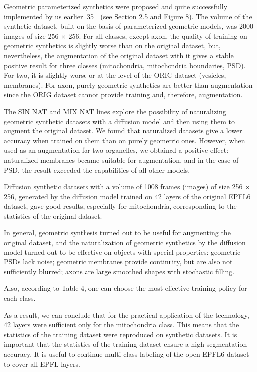 \documentclass[journal,article,submit,pdftex,moreauthors]{Definitions/mdpi}
\begin{document}
Geometric parameterized synthetics were proposed and quite successfully implemented by us earlier [35 ] (see Section 2.5 and Figure 8). The volume of the synthetic dataset, built on the basis of parameterized geometric models, was 2000 images of size 256 × 256. For all classes, except axon, the quality of training on geometric synthetics is slightly worse than on the original dataset, but, nevertheless, the augmentation of the original dataset with it gives a stable positive result for three classes (mitochondria, mitochondria boundaries, PSD). For two, it is slightly worse or at the level of the ORIG dataset (vesicles, membranes). For axon, purely geometric synthetics are better than augmentation since the ORIG dataset cannot provide training and, therefore, augmentation.

The SIN NAT and MIX NAT lines explore the possibility of naturalizing geometric synthetic datasets with a diffusion model and then using them to augment the original dataset. We found that naturalized datasets give a lower accuracy when trained on them than on purely geometric ones. However, when used as an augmentation for two organelles, we obtained a positive effect: naturalized membranes became suitable for augmentation, and in the case of PSD, the result exceeded the capabilities of all other models.

Diffusion synthetic datasets with a volume of 1008 frames (images) of size 256 × 256, generated by the diffusion model trained on 42 layers of the original EPFL6 dataset, gave good results, especially for mitochondria, corresponding to the statistics of the original dataset.

In general, geometric synthesis turned out to be useful for augmenting the original dataset, and the naturalization of geometric synthetics by the diffusion model turned out to be effective on objects with special properties: geometric PSDs lack noise; geometric membranes provide continuity, but are also not sufficiently blurred; axons are large smoothed shapes with stochastic filling.

Also, according to Table 4, one can choose the most effective training policy for each class.

As a result, we can conclude that for the practical application of the technology, 42 layers were sufficient only for the mitochondria class. This means that the statistics of the training dataset were reproduced on synthetic datasets. It is important that the statistics of the training dataset ensure a high segmentation accuracy. It is useful to continue multi-class labeling of the open EPFL6 dataset to cover all EPFL layers.
\end{document}
